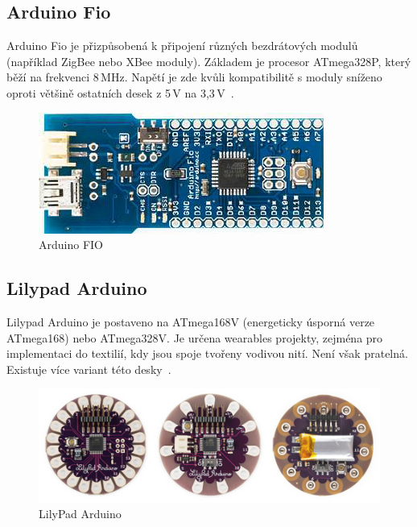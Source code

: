 	
	
		
		\subsection{Arduino Fio} 
		Arduino Fio je přizpůsobená k připojení různých bezdrátových modulů (například ZigBee nebo XBee moduly). Základem je procesor ATmega328P, který běží na frekvenci 8\,MHz. Napětí je zde kvůli kompatibilitě s moduly sníženo oproti většině ostatních desek z 5\,V na 3,3\,V~\cite{ArduinoFio}.	
			\begin{figure}[!h]
  \begin{center}
    \includegraphics[scale=0.45]{obrazky/emded_arduino_fio}
  \end{center}
  \caption{Arduino FIO~\cite{ArduinoFio}}
\end{figure}
	
		\subsection{Lilypad Arduino} 
		Lilypad Arduino je postaveno na ATmega168V (energeticky úsporná verze ATmega168) nebo ATmega328V. Je určena wearables projekty, zejména pro implementaci do textilií, kdy jsou spoje tvořeny vodivou nití. Není však pratelná. Existuje více variant této desky~\cite{ArduinoLilipad}.	
			\begin{figure}[!h]
 \begin{center}
    \includegraphics[scale=0.5]{obrazky/emded_arduino_lilipad}
  \end{center}
  \caption{LilyPad Arduino~\cite{ArduinoLilipad}}
\end{figure}
		
